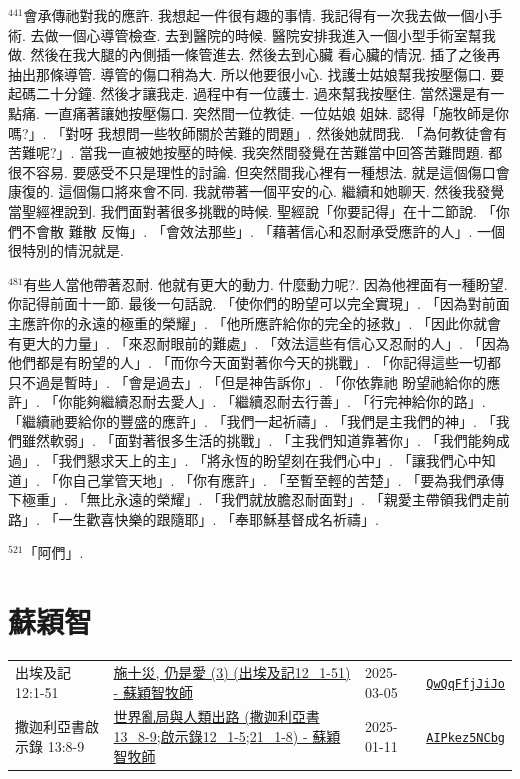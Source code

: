 \documentclass{book}
\begin{document}
$^{441}$會承傳祂對我的應許.
我想起一件很有趣的事情.
我記得有一次我去做一個小手術.
去做一個心導管檢查.
去到醫院的時候.
醫院安排我進入一個小型手術室幫我做.
然後在我大腿的內側插一條管進去.
然後去到心臟 看心臟的情況.
插了之後再抽出那條導管.
導管的傷口稍為大.
所以他要很小心.
找護士姑娘幫我按壓傷口.
要起碼二十分鐘.
然後才讓我走.
過程中有一位護士.
過來幫我按壓住.
當然還是有一點痛.
一直痛著讓她按壓傷口.
突然間一位教徒.
一位姑娘 姐妹.
認得「施牧師是你嗎?」.
「對呀 我想問一些牧師關於苦難的問題」.
然後她就問我.
「為何教徒會有苦難呢?」.
當我一直被她按壓的時候.
我突然間發覺在苦難當中回答苦難問題.
都很不容易.
要感受不只是理性的討論.
但突然間我心裡有一種想法.
就是這個傷口會康復的.
這個傷口將來會不同.
我就帶著一個平安的心.
繼續和她聊天.
然後我發覺當聖經裡說到.
我們面對著很多挑戰的時候.
聖經說「你要記得」在十二節說.
「你們不會散 難散 反悔」.
「會效法那些」.
「藉著信心和忍耐承受應許的人」.
一個很特別的情況就是.

$^{481}$有些人當他帶著忍耐.
他就有更大的動力.
什麼動力呢?.
因為他裡面有一種盼望.
你記得前面十一節.
最後一句話說.
「使你們的盼望可以完全實現」.
「因為對前面主應許你的永遠的極重的榮耀」.
「他所應許給你的完全的拯救」.
「因此你就會有更大的力量」.
「來忍耐眼前的難處」.
「效法這些有信心又忍耐的人」.
「因為他們都是有盼望的人」.
「而你今天面對著你今天的挑戰」.
「你記得這些一切都只不過是暫時」.
「會是過去」.
「但是神告訴你」.
「你依靠祂 盼望祂給你的應許」.
「你能夠繼續忍耐去愛人」.
「繼續忍耐去行善」.
「行完神給你的路」.
「繼續祂要給你的豐盛的應許」.
「我們一起祈禱」.
「我們是主我們的神」.
「我們雖然軟弱」.
「面對著很多生活的挑戰」.
「主我們知道靠著你」.
「我們能夠成過」.
「我們懇求天上的主」.
「將永恆的盼望刻在我們心中」.
「讓我們心中知道」.
「你自己掌管天地」.
「你有應許」.
「至暫至輕的苦楚」.
「要為我們承傳下極重」.
「無比永遠的榮耀」.
「我們就放膽忍耐面對」.
「親愛主帶領我們走前路」.
「一生歡喜快樂的跟隨耶」.
「奉耶穌基督成名祈禱」.

$^{521}$「阿們」.
\newpage



\chapter{蘇穎智}\label{ch:preacher9}
\begin{multicols}{3}
\minitoc
\end{multicols}
{ \scriptsize


\begin{xltabular}{\textwidth}{|p{0.15\textwidth} p{0.6\textwidth}|p{0.07\textwidth} p{0.1\textwidth}|}
\hline
出埃及記 12:1-51 & \hyperref[sec:QwQqFfjJiJo]{施十災, 仍是愛 (3) (出埃及記12\_1-51) -  蘇穎智牧師} & 2025-03-05 & \href{https://youtube.com/watch?v=QwQqFfjJiJo}{\texttt{QwQqFfjJiJo}} \\
撒迦利亞書啟示錄 13:8-9 & \hyperref[sec:AIPkez5NCbg]{世界亂局與人類出路 (撒迦利亞書13\_8-9;啟示錄12\_1-5;21\_1-8) -  蘇穎智牧師} & 2025-01-11 & \href{https://youtube.com/watch?v=AIPkez5NCbg}{\texttt{AIPkez5NCbg}} \\
\hline
\end{xltabular}
}
\newpage
\end{document}
